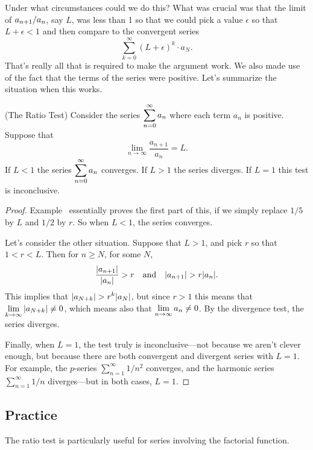 Under what circumstances could we do this? What was crucial was that
the limit of $\displaystyle a_{n+1}/a_n$, say $L$, was less than 1 so that we
could pick a value $\epsilon$ so that $L + \epsilon < 1$ and then
compare to the convergent series
$$
\sum_{k=0}^\infty (L + \epsilon)^k \cdot a_N.
$$
That's really all that is required to make the argument work. We also
made use of the fact that the terms of the series were positive.
  Let's summarize the
situation when this works.

\begin{theorem} (The Ratio Test)
  \label{theorem:ratio-test}
Consider the series $\displaystyle\sum_{n=0}^\infty a_n$ where each term $a_n$ is positive.
Suppose that
$$
\lim_{n\to \infty} \frac{a_{n+1}}{a_n}=L.
$$
If $L<1$ the series $\displaystyle\sum_{n=0}^\infty a_n$ converges.  If $L>1$ the
series diverges.  If $L=1$ this test is inconclusive.
\end{theorem}

\begin{proof}
  Example~ essentially proves
  the first part of this, if we simply replace $1/5$ by $L$ and $1/2$
  by $r$.  So when $L< 1$, the series converges.

Let's consider the other situation.  Suppose that $L>1$, and pick $r$
so that $1<r<L$.  Then for $n\ge N$, for some $N$,
$${|a_{n+1}|\over |a_n|} > r \hbox{\quad and\quad} |a_{n+1}| > r|a_n|.$$
This implies that $\ds |a_{N+k}|>r^k|a_N|$, but since $r>1$ this means
that $\displaystyle\lim_{k\to\infty}|a_{N+k}| \neq 0$, which means also that
$\displaystyle\lim_{n\to\infty}a_n \neq 0$. By the divergence test, the series
diverges.

Finally, when $L = 1$, the test truly is inconclusive---not because we
aren't clever enough, but because there are both convergent and
divergent series with $L = 1$.  For example, the $p$-series
$\sum_{n=1}^\infty 1/n^2$ converges, and the harmonic series
$\sum_{n=1}^\infty 1/n$ diverges---but in both cases, $L = 1$.
\end{proof}

\subsection{Practice}

The ratio test is particularly useful for series involving
the factorial function.


